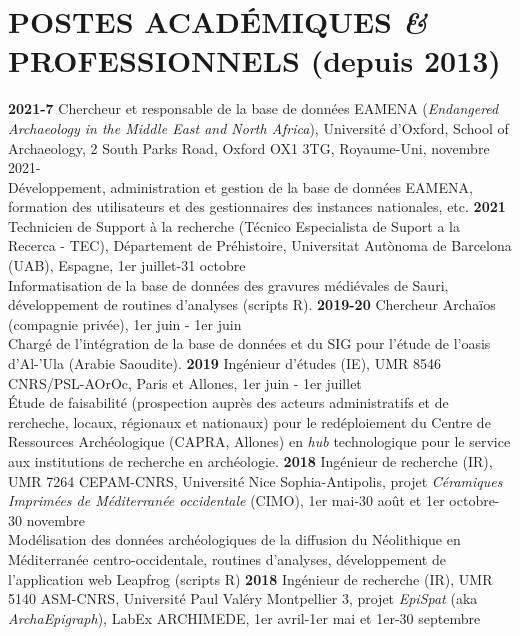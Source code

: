 \documentclass{article}
\begin{document}
\section{POSTES ACADÉMIQUES \textit{\&} PROFESSIONNELS (depuis 2013)}

\textbf{2021-7} Chercheur et responsable de la base de données EAMENA (\textit{Endangered Archaeology in the Middle East and North Africa}), Université d'Oxford, School of Archaeology, 2 South Parks Road, Oxford OX1 3TG, Royaume-Uni, novembre 2021-\\
\hspace*{0.5cm} Développement, administration et gestion de la base de données EAMENA, formation des utilisateurs et des gestionnaires des instances nationales, etc.
\smallbreak
\textbf{2021} Technicien de Support à la recherche (Técnico Especialista de Suport a la Recerca - TEC), Département de Préhistoire, Universitat Autònoma de Barcelona (UAB), Espagne, 1er juillet-31 octobre \\
\hspace*{0.5cm} Informatisation de la base de données des gravures médiévales de Sauri, développement de routines d'analyses (scripts R).
\smallbreak
\textbf{2019-20} Chercheur Archaïos (compagnie privée), 1er juin - 1er juin \\
\hspace*{0.5cm} Chargé de l'intégration de la base de données et du SIG pour l'étude de l'oasis d'Al-'Ula (Arabie Saoudite).
\smallbreak
\textbf{2019} Ingénieur d'études (IE), UMR 8546 CNRS/PSL-AOrOc, Paris et Allones, 1er juin - 1er juillet \\ 
\hspace*{0.5cm} Étude de faisabilité (prospection auprès des acteurs administratifs et de rercheche, locaux, régionaux et nationaux) pour le redéploiement du Centre de Ressources Archéologique (CAPRA, Allones) en \textit{hub} technologique pour le service aux institutions de recherche en archéologie. 
\smallbreak
\textbf{2018} Ingénieur de recherche (IR), UMR 7264 CEPAM-CNRS, Université Nice Sophia-Antipolis, projet \textit{Céramiques Imprimées de Méditerranée occidentale} (CIMO), 1er mai-30 août et 1er octobre-30 novembre \\
\hspace*{0.5cm} Modélisation des données archéologiques de la diffusion du Néolithique en Méditerranée centro-occidentale, routines d'analyses, développement de l'application web Leapfrog (scripts R)
\textbf{2018} Ingénieur de recherche (IR), UMR 5140 ASM-CNRS, Université Paul Valéry Montpellier 3, projet \textit{EpiSpat} (aka \textit{ArchaEpigraph}), LabEx ARCHIMEDE, 1er avril-1er mai et 1er-30 septembre \\
\end{document}
